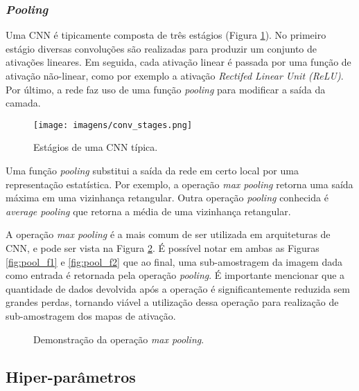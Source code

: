 \documentclass[
12pt,       %
openright,      %
oneside,      %
a4paper,      %
english,      %
french,       %
spanish,      %
brazil        %
]{abntex2}
\begin{document}
\subsubsection{\textit{Pooling}} \label{pooling}

Uma CNN é tipicamente composta de três estágios (Figura \ref{fig:conv_stages}). No primeiro estágio diversas convoluções são realizadas para produzir um conjunto de ativações lineares. Em seguida, cada ativação linear é passada por uma função de ativação não-linear, como por exemplo a ativação \textit{Rectifed Linear Unit (ReLU)}. Por último, a rede faz uso de uma função \textit{pooling} para modificar a saída da camada.

\begin{figure}[ht]
\centering
\caption{Estágios de uma CNN típica.}
\texttt{[image: imagens/conv\_stages.png]}
\label{fig:conv_stages}
\end{figure}

Uma função \textit{pooling} substitui a saída da rede em certo local por uma representação estatística. Por exemplo, a operação \textit{max pooling} \cite{Zhou-et-al-1988} retorna uma saída máxima em uma vizinhança retangular. Outra operação \textit{pooling} conhecida é \textit{average pooling} que retorna a média de uma vizinhança retangular.

A operação \textit{max pooling} é a mais comum de ser utilizada em arquiteturas de CNN, e pode ser vista na Figura \ref{fig:pool_operation}. É possível notar em ambas as Figuras \ref{fig:pool_f1} e \ref{fig:pool_f2} que ao final, uma sub-amostragem da imagem dada como entrada é retornada pela operação \textit{pooling}. É importante mencionar que a quantidade de dados devolvida após a operação é significantemente reduzida sem grandes perdas, tornando viável a utilização dessa operação para realização de sub-amostragem dos mapas de ativação.

\begin{figure}[ht]
\centering
\caption{Demonstração da operação \textit{max pooling}.}
\hfill
{}
\label{fig:pool_operation}
\end{figure}

\subsection{Hiper-parâmetros} \label{hiperparametros}
\end{document}
